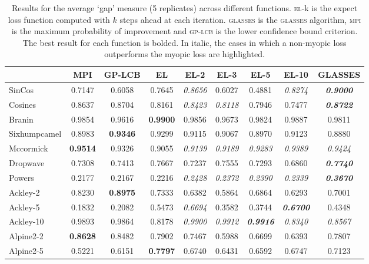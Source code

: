 \documentclass[twoside]{article}
\newcommand{\acr}[1]{\textsc{#1}\xspace}
\newcommand{\us}{\acr{glasses}}
\newcommand{\mpi}{\acr{mpi}}
\newcommand{\el}{\acr{el}}
\newcommand{\lcb}{\acr{gp-lcb}}
\begin{document}
\begin{table}[t!]
\begin{center}
\begin{tabular}{lcccccccc}
\toprule
{} &     MPI &     GP-LCB &      EL &    EL-2 &    EL-3 &    EL-5 &  EL-10 &    GLASSES \\
\midrule
SinCos  &  0.7147 &  0.6058 &  0.7645 &  \emph{0.8656} &  0.6027 &  0.4881 &  \emph{0.8274} &  \emph{\textbf{0.9000}} \\ 
Cosines           &  0.8637 &  0.8704 &  0.8161 &  \emph{0.8423} &  \emph{0.8118} &  0.7946 &  0.7477 &  \emph{\textbf{0.8722}} \\
Branin              &  0.9854 &  0.9616 &  \textbf{0.9900} &  0.9856 &  0.9673 &  0.9824 &  0.9887 &  0.9811 \\
Sixhumpcamel        &  0.8983 &  \textbf{0.9346} &  0.9299 &  0.9115 &  0.9067 &  0.8970 &  0.9123 &  0.8880 \\
Mccormick           & \textbf{0.9514} &  0.9326 &  0.9055 &  \emph{0.9139} &  \emph{0.9189} &  \emph{0.9283} &  \emph{0.9389} &  \emph{0.9424} \\
Dropwave            &  0.7308 &  0.7413 &  0.7667 &  0.7237 &  0.7555 &  0.7293 &  0.6860 &  \emph{\textbf{0.7740}} \\
Powers              &  0.2177 &  0.2167 &  0.2216 &  \emph{0.2428} &  \emph{0.2372} &  \emph{0.2390} &  \emph{0.2339} &  \emph{\textbf{0.3670}} \\
Ackley-2 &  0.8230 &  \textbf{0.8975} &  0.7333 &  0.6382 &  0.5864 &  0.6864 &  0.6293 &  0.7001 \\
Ackley-5  & 0.1832&   0.2082&   0.5473&   \emph{0.6694}&  0.3582&   0.3744&   \emph{\textbf{0.6700}} &  0.4348\\ 
Ackley-10 &  0.9893 &  0.9864 &  0.8178 &   \emph{0.9900} &   \emph{0.9912} &   \emph{\textbf{0.9916}} &   \emph{0.8340} &   \emph{0.8567} \\
Alpine2-2 &  \textbf{0.8628} &  0.8482 &  0.7902 &  0.7467 &  0.5988 &  0.6699 &  0.6393 &  0.7807 \\
Alpine2-5  &  0.5221 &  0.6151 &  \textbf{0.7797} &  0.6740 &  0.6431 &  0.6592 &  0.6747 &  0.7123 \\
\bottomrule
\end{tabular}\caption{Results for the average `gap' measure (5 replicates) across different functions.  \el-k is the expect loss function computed with $k$ steps ahead at each iteration. \us is the \us algorithm, \mpi is the maximum probability of improvement and \lcb is the lower confidence bound criterion. The best result for each function is bolded. In italic, the cases in which a non-myopic loss outperforms the myopic  loss are highlighted.}\label{table:comparision}
\end{center}
\end{table}
\end{document}
